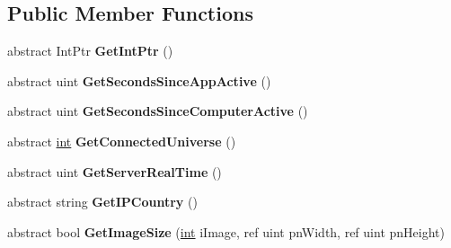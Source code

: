 \subsection*{Public Member Functions}
\begin{DoxyCompactItemize}
\item 
\hypertarget{classValve_1_1Steamworks_1_1ISteamUtils_a8af14674c875ff89988955c889a80fc3}{}abstract Int\+Ptr {\bfseries Get\+Int\+Ptr} ()\label{classValve_1_1Steamworks_1_1ISteamUtils_a8af14674c875ff89988955c889a80fc3}

\item 
\hypertarget{classValve_1_1Steamworks_1_1ISteamUtils_a449a1dde908b6de6dc1e81ec185d4fb5}{}abstract uint {\bfseries Get\+Seconds\+Since\+App\+Active} ()\label{classValve_1_1Steamworks_1_1ISteamUtils_a449a1dde908b6de6dc1e81ec185d4fb5}

\item 
\hypertarget{classValve_1_1Steamworks_1_1ISteamUtils_a7163a6bfe167236bc430868d4328163e}{}abstract uint {\bfseries Get\+Seconds\+Since\+Computer\+Active} ()\label{classValve_1_1Steamworks_1_1ISteamUtils_a7163a6bfe167236bc430868d4328163e}

\item 
\hypertarget{classValve_1_1Steamworks_1_1ISteamUtils_add1db15ce15e9e64ed275545d48a1154}{}abstract \hyperlink{SDL__thread_8h_a6a64f9be4433e4de6e2f2f548cf3c08e}{int} {\bfseries Get\+Connected\+Universe} ()\label{classValve_1_1Steamworks_1_1ISteamUtils_add1db15ce15e9e64ed275545d48a1154}

\item 
\hypertarget{classValve_1_1Steamworks_1_1ISteamUtils_a38c6160184d320f86eb0e80e935e7bfb}{}abstract uint {\bfseries Get\+Server\+Real\+Time} ()\label{classValve_1_1Steamworks_1_1ISteamUtils_a38c6160184d320f86eb0e80e935e7bfb}

\item 
\hypertarget{classValve_1_1Steamworks_1_1ISteamUtils_a1cd69463ef0092debe8a5fef2b21a3cd}{}abstract string {\bfseries Get\+I\+P\+Country} ()\label{classValve_1_1Steamworks_1_1ISteamUtils_a1cd69463ef0092debe8a5fef2b21a3cd}

\item 
\hypertarget{classValve_1_1Steamworks_1_1ISteamUtils_aa133367f000ad794b9fb60360437e75b}{}abstract bool {\bfseries Get\+Image\+Size} (\hyperlink{SDL__thread_8h_a6a64f9be4433e4de6e2f2f548cf3c08e}{int} i\+Image, ref uint pn\+Width, ref uint pn\+Height)\label{classValve_1_1Steamworks_1_1ISteamUtils_aa133367f000ad794b9fb60360437e75b}


\end{DoxyCompactItemize}
